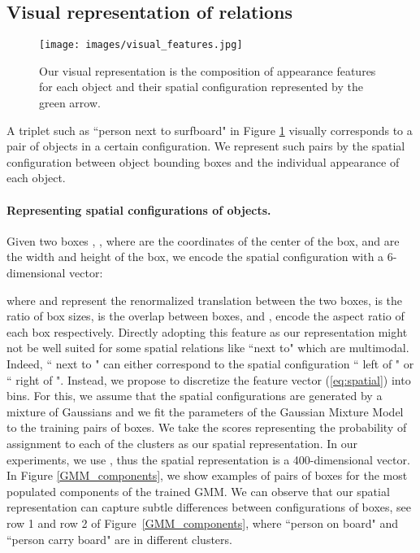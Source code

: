 \documentclass[10pt,twocolumn,letterpaper]{article}
\newcommand{\spaceparagraph}{\vspace{-.35cm}}
\begin{document}
\subsection{Visual representation of relations}
\label{visual_representation}

\begin{figure}[t]
	\begin{center}
   	\texttt{[image: images/visual\_features.jpg]}
	\end{center}
	\setlength\abovecaptionskip{-5pt}
   	\caption{Our visual representation is the composition of appearance features for each object  and their spatial configuration  represented by the green arrow.}
   	\vspace{-.4cm}
	\label{fig:visual_representation}
\end{figure}

A triplet  such as ``person next to surfboard" in Figure \ref{fig:visual_representation} visually corresponds to a pair of objects  in a certain configuration. We represent such pairs by the spatial configuration between object bounding boxes  and the individual appearance of each object. 

\spaceparagraph
\paragraph{Representing spatial configurations of objects.} Given two boxes , , where  are the coordinates of the center of the box, and  are the width and height of the box, we encode the spatial configuration with a 6-dimensional vector:
\vspace{-2pt}

 
\noindent where  and  represent the renormalized translation between the two boxes,  is the ratio of box sizes,  is the overlap between boxes, and ,  encode the aspect ratio of each box respectively. Directly adopting this feature as our representation might not be well suited for some spatial relations like ``next to" which are multimodal. Indeed, `` next to " can either correspond to the spatial configuration `` left of " or `` right of ". Instead, we propose to discretize the feature vector (\ref{eq:spatial}) into  bins. For this, we assume that the spatial configurations  are generated by a mixture of  Gaussians and we fit the parameters of the Gaussian Mixture Model to the training pairs of boxes. We take the scores representing the probability of assignment to each of the  clusters as our spatial representation. In our experiments, we use , thus the spatial representation is a 400-dimensional vector. In Figure \ref{GMM_components}, we show examples of pairs of boxes for the most populated components of the trained GMM. We can observe that our spatial representation can capture subtle differences between configurations of boxes, see row 1 and row 2 of Figure~\ref{GMM_components}, where ``person on board" and ``person carry board" are in different clusters.
  
\end{document}
